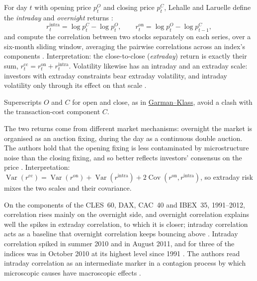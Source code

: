 \begin{qfdefinition}\label{def:intraday-overnight-returns}
 For day $t$ with opening price $p^O_t$ and closing price $p^C_t$, Lehalle and Laruelle define the \emph{intraday} and \emph{overnight} returns \citep[chap.~2, sec.~2.5.1, eqs.~(2.2)--(2.3), p.~175]{alpha-laruelle}:
\[ r^{\mathrm{intra}}_t=\log p^C_t-\log p^O_t, \qquad r^{\mathrm{on}}_t=\log p^O_t-\log p^C_{t-1}, \]
and compute the correlation between two stocks separately on each series, over a six-month sliding window, averaging the pairwise correlations across an index's components \citep[same sec., pp.~174--175]{alpha-laruelle}. Interpretation: the close-to-close (\emph{extraday}) return is exactly their sum, $r^{\mathrm{cc}}_t=r^{\mathrm{on}}_t+r^{\mathrm{intra}}_t$. Volatility likewise has an intraday and an extraday scale: investors with extraday constraints bear extraday volatility, and intraday volatility only through its effect on that scale \citep[same chap., sec.~2.5, p.~169]{alpha-laruelle}.

 Superscripts $O$ and $C$ for open and close, as in \hyperref[meth:garman-klass-volatility]{Garman--Klass}, avoid a clash with the transaction-cost component $C$.

 The two returns come from different market mechanisms: overnight the market is organised as an auction fixing, during the day as a continuous double auction. The authors hold that the opening fixing is less contaminated by microstructure noise than the closing fixing, and so better reflects investors' consensus on the price \citep[same chap., sec.~2.5.1, p.~177]{alpha-laruelle}. Interpretation: $\operatorname{Var}(r^{\mathrm{cc}})=\operatorname{Var}(r^{\mathrm{on}})+\operatorname{Var}(r^{\mathrm{intra}})+2\operatorname{Cov}(r^{\mathrm{on}},r^{\mathrm{intra}})$, so extraday risk mixes the two scales and their covariance.

 On the components of the CLES~60, DAX, CAC~40 and IBEX~35, 1991--2012, correlation rises mainly on the overnight side, and overnight correlation explains well the spikes in extraday correlation, to which it is closer; intraday correlation acts as a baseline that overnight correlation keeps bouncing above \citep[same sec., Figures~2.27--2.28, pp.~174--177]{alpha-laruelle}. Intraday correlation spiked in summer 2010 and in August 2011, and for three of the indices was in October 2010 at its highest level since 1991 \citep[same sec., pp.~174 and~176]{alpha-laruelle}. The authors read intraday correlation as an intermediate marker in a contagion process by which microscopic causes have macroscopic effects \citep[same sec., p.~174]{alpha-laruelle}.


\end{qfdefinition}
